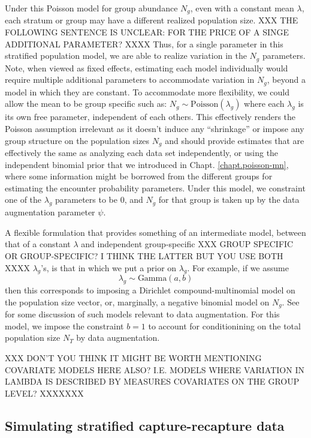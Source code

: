 Under this Poisson model for group abundance $N_g$, even with a constant mean $\lambda$, each
stratum or group may have a different realized population size. XXX THE FOLLOWING SENTENCE IS UNCLEAR: FOR THE PRICE OF A SINGE ADDITIONAL PARAMETER? XXXX Thus,
for a single parameter in this stratified population model, we are
able to realize variation in the $N_{g}$ parameters. Note, when viewed
as fixed effects, estimating each model individually would require
multiple additional parameters to accommodate variation in $N_{g}$,
beyond a model in which they are constant. 
To accommodate more 
flexibility, we could allow the mean to be group specific such as:
$N_g \sim \mbox{Poisson}(\lambda_{g})$ where each $\lambda_{g}$ is its own
free parameter, independent of each others.  This effectively renders
the Poisson assumption irrelevant as it doesn't induce any
``shrinkage'' or impose any group structure on the 
population sizes $N_{g}$ and should provide estimates that are
effectively the same as analyzing each data set independently, or
using the independent binomial prior that we introduced in
Chapt. \ref{chapt.poisson-mn}, where some information might be
borrowed from the different groups for estimating the encounter
probability parameters.
Under this model, we constraint one of the $\lambda_{g}$ parameters
to be 0, and $N_{g}$ for that group is taken up by the data 
augmentation parameter $\psi$.

A flexible formulation that provides something of an intermediate model,
between that of a constant $\lambda$ and independent group-specific XXX GROUP SPECIFIC OR GROUP-SPECIFIC? I THINK THE LATTER BUT YOU USE BOTH XXXX
$\lambda_{g}$'s, is that in which we put a prior on $\lambda_{g}$. For
example, if we assume
\[
 \lambda_{g} \sim \mbox{Gamma}(a,b)
\]
then this corresponds to imposing a Dirichlet compound-multinomial
model on the population size vector, or, marginally, a negative
binomial model on $N_{g}$. See \citet{takemura:1999} for some
discussion of such models relevant to data augmentation.  For this
model, we impose the constraint $b=1$ to account for conditionining on
the total population size $N_{T}$ by data augmentation. 

XXX DON'T YOU THINK IT MIGHT BE WORTH MENTIONING COVARIATE MODELS HERE ALSO? I.E. MODELS WHERE VARIATION IN LAMBDA IS DESCRIBED BY MEASURES COVARIATES ON THE GROUP LEVEL? XXXXXXX

\subsection{
Simulating stratified 
capture-recapture data
}

